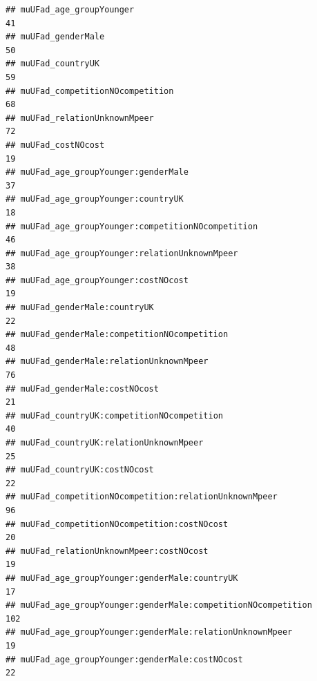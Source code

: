 \documentclass[
]{article}
\begin{document}
\begin{verbatim}
## muUFad_age_groupYounger                                                                            41
## muUFad_genderMale                                                                                  50
## muUFad_countryUK                                                                                   59
## muUFad_competitionNOcompetition                                                                    68
## muUFad_relationUnknownMpeer                                                                        72
## muUFad_costNOcost                                                                                  19
## muUFad_age_groupYounger:genderMale                                                                 37
## muUFad_age_groupYounger:countryUK                                                                  18
## muUFad_age_groupYounger:competitionNOcompetition                                                   46
## muUFad_age_groupYounger:relationUnknownMpeer                                                       38
## muUFad_age_groupYounger:costNOcost                                                                 19
## muUFad_genderMale:countryUK                                                                        22
## muUFad_genderMale:competitionNOcompetition                                                         48
## muUFad_genderMale:relationUnknownMpeer                                                             76
## muUFad_genderMale:costNOcost                                                                       21
## muUFad_countryUK:competitionNOcompetition                                                          40
## muUFad_countryUK:relationUnknownMpeer                                                              25
## muUFad_countryUK:costNOcost                                                                        22
## muUFad_competitionNOcompetition:relationUnknownMpeer                                               96
## muUFad_competitionNOcompetition:costNOcost                                                         20
## muUFad_relationUnknownMpeer:costNOcost                                                             19
## muUFad_age_groupYounger:genderMale:countryUK                                                       17
## muUFad_age_groupYounger:genderMale:competitionNOcompetition                                       102
## muUFad_age_groupYounger:genderMale:relationUnknownMpeer                                            19
## muUFad_age_groupYounger:genderMale:costNOcost                                                      22

\end{verbatim}
\end{document}
